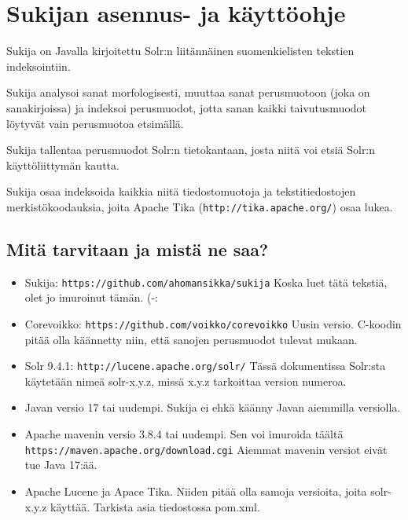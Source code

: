 \documentclass[12pt]{article}
\begin{document}
\pagestyle{fancy}
\setlength{\parindent}{0pt}
\setlength{\parskip}{1ex plus 0.5ex minus 0.2ex}
\section*{Sukijan asennus- ja käyttöohje}


Sukija on Javalla kirjoitettu Solr:n liitännäinen suomenkielisten
tekstien indeksointiin.

Sukija analysoi sanat morfologisesti, muuttaa sanat perusmuotoon (joka
on sanakirjoissa) ja indeksoi perusmuodot, jotta sanan kaikki
taivutusmuodot löytyvät vain perusmuotoa etsimällä.

Sukija tallentaa perusmuodot Solr:n tietokantaan, josta niitä voi
etsiä Solr:n käyttöliittymän kautta.

Sukija osaa indeksoida kaikkia niitä tiedostomuotoja ja
tekstitiedostojen merkistökoodauksia, joita Apache Tika
(\verb=http://tika.apache.org/=) osaa lukea.


\subsection*{Mitä tarvitaan ja mistä ne saa?}

\begin{itemize}
\item Sukija:
      \verb=https://github.com/ahomansikka/sukija=
      Koska luet tätä tekstiä, olet jo imuroinut tämän. (-:

\item Corevoikko:
      \verb=https://github.com/voikko/corevoikko=
      Uusin versio. C-koodin pitää olla käännetty niin,
      että sanojen perusmuodot tulevat mukaan.

\item Solr 9.4.1:
      \verb=http://lucene.apache.org/solr/=
      Tässä dokumentissa Solr:sta käytetään nimeä solr-x.y.z,
      missä x.y.z tarkoittaa version numeroa.

\item Javan versio 17 tai uudempi. Sukija ei ehkä käänny Javan aiemmilla versiolla.

\item Apache mavenin versio 3.8.4 tai uudempi. Sen voi imuroida täältä
      \verb=https://maven.apache.org/download.cgi=
      Aiemmat mavenin versiot eivät tue Java 17:ää.

\item Apache Lucene ja Apace Tika. Niiden pitää olla samoja versioita,
      joita solr-x.y.z käyttää. Tarkista asia tiedostossa pom.xml.
\end{itemize}
\end{document}

